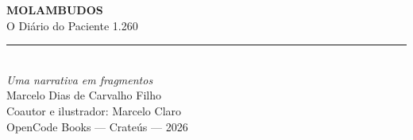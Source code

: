 \thispagestyle{empty}
\begin{center}
\vspace*{0.18\textheight}
{\fontsize{30}{34}\selectfont\bfseries MOLAMBUDOS}\\[0.6em]
{\fontsize{16}{20}\selectfont O Diário do Paciente 1.260}\\[1.2em]
{\color{mem}\rule{0.28\textwidth}{1.2pt}}\\[1.0em]
{\itshape Uma narrativa em fragmentos}\\[2.0em]
{\large Marcelo Dias de Carvalho Filho}\\[0.3em]
{\small Coautor e ilustrador: Marcelo Claro}\\[2.0em]
{\small OpenCode Books --- Crateús --- 2026}
\end{center}
\vfill
